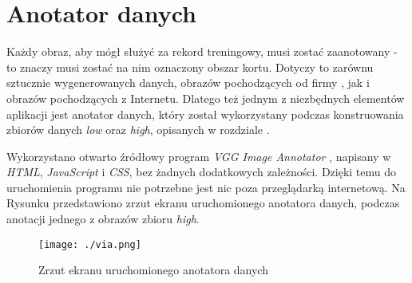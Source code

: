 \newpage
\section{Anotator danych}
\label{sec:anotator}

Każdy obraz, aby mógł służyć za rekord treningowy, musi zostać zaanotowany - to znaczy musi zostać na nim oznaczony obszar kortu.
Dotyczy to zarównu sztucznie wygenerowanych danych, obrazów pochodzących od firmy \blue{}, jak i obrazów pochodzących z Internetu.
Dlatego też jednym z niezbędnych elementów aplikacji jest anotator danych, który został wykorzystany podczas konstruowania zbiorów danych \textit{low} oraz \textit{high}, opisanych w rozdziale .

Wykorzystano otwarto źródłowy program \textit{VGG Image Annotator} \cite{dutta2016via} \cite{dutta2019vgg}, napisany w \textit{HTML}, \textit{JavaScript} i \textit{CSS}, bez żadnych dodatkowych zależności.
Dzięki temu do uruchomienia programu nie potrzebne jest nic poza przeglądarką internetową.
Na Rysunku  przedstawiono zrzut ekranu uruchomionego anotatora danych, podczas anotacji jednego z obrazów zbioru  \textit{high}.

\vspace{1cm}

\begin{figure}[!htb]
  \texttt{[image: ./via.png]}
    \caption{Zrzut ekranu uruchomionego anotatora danych}
    \label{fig:via}
\end{figure}
